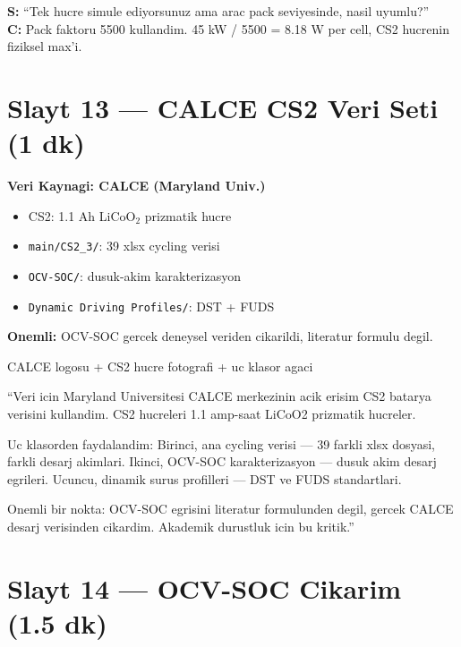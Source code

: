 \documentclass[11pt,a4paper]{article}
\begin{document}
\begin{soruboks}
\textbf{S:} ``Tek hucre simule ediyorsunuz ama arac pack seviyesinde, nasil uyumlu?''\\
\textbf{C:} Pack faktoru 5500 kullandim. 45 kW / 5500 = 8.18 W per cell, CS2 hucrenin fiziksel max'i.
\end{soruboks}

\section{Slayt 13 --- CALCE CS2 Veri Seti (1 dk)}

\begin{slytboks}
\textbf{Veri Kaynagi: CALCE (Maryland Univ.)}
\begin{itemize}
\item CS2: 1.1 Ah LiCoO$_2$ prizmatik hucre
\item \texttt{main/CS2\_3/}: 39 xlsx cycling verisi
\item \texttt{OCV-SOC/}: dusuk-akim karakterizasyon
\item \texttt{Dynamic Driving Profiles/}: DST + FUDS
\end{itemize}
\textbf{Onemli:} OCV-SOC gercek deneysel veriden cikarildi, literatur formulu degil.
\end{slytboks}

\begin{gorselboks}
CALCE logosu + CS2 hucre fotografi + uc klasor agaci
\end{gorselboks}

\begin{sayboks}
``Veri icin Maryland Universitesi CALCE merkezinin acik erisim CS2 batarya verisini kullandim. CS2 hucreleri 1.1 amp-saat LiCoO2 prizmatik hucreler.

Uc klasorden faydalandim: Birinci, ana cycling verisi --- 39 farkli xlsx dosyasi, farkli desarj akimlari. Ikinci, OCV-SOC karakterizasyon --- dusuk akim desarj egrileri. Ucuncu, dinamik surus profilleri --- DST ve FUDS standartlari.

Onemli bir nokta: OCV-SOC egrisini literatur formulunden degil, gercek CALCE desarj verisinden cikardim. Akademik durustluk icin bu kritik.''
\end{sayboks}

\section{Slayt 14 --- OCV-SOC Cikarim (1.5 dk)}
\end{document}
